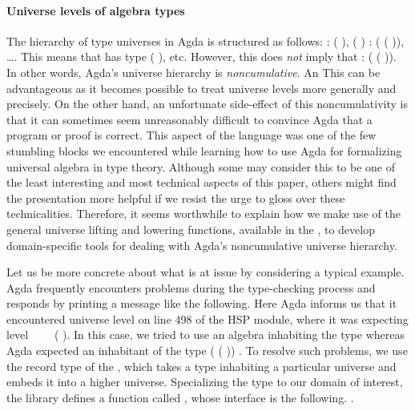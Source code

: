 \paragraph*{Universe levels of algebra types}
The hierarchy of type universes in Agda is structured as follows:
  :  ( ),  ( ) : 
( ( )), …. This means that   has type 
( ), etc.  However, this does \emph{not} imply that   :
 ( ( )). In other words, Agda's universe hierarchy is
\emph{noncumulative}.
\ifshort
An
\else
This can be advantageous as it becomes possible to treat universe
levels more generally and precisely. On the other hand, an
\fi
unfortunate side-effect of this noncumulativity is that it can sometimes seem unreasonably
difficult to convince Agda that a program or proof is correct.
\ifshort\else
This aspect of the language was one of the few stumbling
blocks we encountered while learning how to use Agda for formalizing universal algebra in
type theory. Although some may consider this to be one of the least interesting and most
technical aspects of this paper, others might find the presentation more helpful if we
resist the urge to gloss over these technicalities.
\fi
Therefore, it seems worthwhile to explain how we make use
of the general universe lifting and lowering functions, available in the \agdastdlib, to
develop domain-specific tools for dealing with Agda's noncumulative universe hierarchy.

\ifshort\else
Let us be more concrete about what is at issue by considering a typical example. Agda
frequently encounters problems during the type-checking process and responds by printing a
message like the following.
{\color{red}{\small
\begin{verbatim}
  HSP.lagda:498,20-23
  α != 𝓞 ⊔ 𝓥 ⊔ (lsuc α) when checking that... has type...
\end{verbatim}}}
\noindent Here Agda informs us that it encountered universe level  on line 498 of
the HSP module, where it was expecting level ~~~~(
). In this case, we tried to use an algebra inhabiting the type 
  whereas Agda expected an inhabitant of the type  (
   ( )) .
\fi
To resolve such problems, we use the  record type of the \agdastdlib,
which takes a type inhabiting a particular universe and embeds it into a higher universe.
Specializing the  type to our domain of interest, the \agdaalgebras library
defines a function called %
\ifshort
, whose interface is the following.
\vskip-2mm
\else
.

